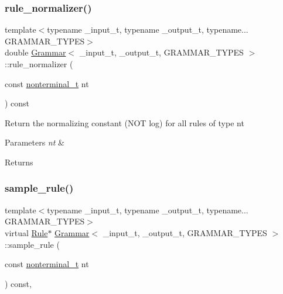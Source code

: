 \subsubsection{\texorpdfstring{rule\+\_\+normalizer()}{rule\_normalizer()}}
{\footnotesize\ttfamily template$<$typename \+\_\+input\+\_\+t, typename \+\_\+output\+\_\+t, typename... G\+R\+A\+M\+M\+A\+R\+\_\+\+T\+Y\+P\+ES$>$ \\
double \hyperlink{class_grammar}{Grammar}$<$ \+\_\+input\+\_\+t, \+\_\+output\+\_\+t, G\+R\+A\+M\+M\+A\+R\+\_\+\+T\+Y\+P\+ES $>$\+::rule\+\_\+normalizer (\begin{DoxyParamCaption}\item[{const \hyperlink{_nonterminal_8h_a1c5bfe9b903f69c83bbde5da7035fef3}{nonterminal\+\_\+t}}]{nt }\end{DoxyParamCaption}) const\hspace{0.3cm}{\ttfamily [inline]}}

Return the normalizing constant (N\+OT log) for all rules of type nt 
\begin{DoxyParams}{Parameters}
{\em nt} & \\
\hline
\end{DoxyParams}
\begin{DoxyReturn}{Returns}

\end{DoxyReturn}
\mbox{\label{class_grammar_a427f722a7cc03e06d2ae9321a8b5b757}} 
\subsubsection{\texorpdfstring{sample\+\_\+rule()}{sample\_rule()}}
{\footnotesize\ttfamily template$<$typename \+\_\+input\+\_\+t, typename \+\_\+output\+\_\+t, typename... G\+R\+A\+M\+M\+A\+R\+\_\+\+T\+Y\+P\+ES$>$ \\
virtual \hyperlink{class_rule}{Rule}$\ast$ \hyperlink{class_grammar}{Grammar}$<$ \+\_\+input\+\_\+t, \+\_\+output\+\_\+t, G\+R\+A\+M\+M\+A\+R\+\_\+\+T\+Y\+P\+ES $>$\+::sample\+\_\+rule (\begin{DoxyParamCaption}\item[{const \hyperlink{_nonterminal_8h_a1c5bfe9b903f69c83bbde5da7035fef3}{nonterminal\+\_\+t}}]{nt }\end{DoxyParamCaption}) const\hspace{0.3cm}{\ttfamily [inline]}, {\ttfamily [virtual]}}

